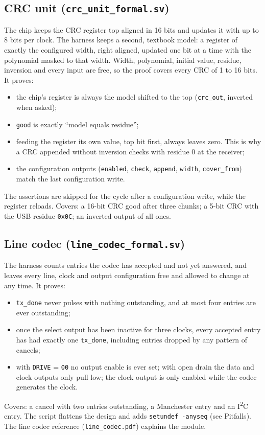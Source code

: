 \documentclass[11pt,a4paper]{article}
\newcommand{\file}[1]{\texttt{#1}}
\begin{document}
\subsection{CRC unit (\file{crc\_unit\_formal.sv})}
The chip keeps the CRC register top aligned in 16 bits and updates it with up to 8 bits per clock. The harness keeps a second, textbook model: a register of exactly the configured width, right aligned, updated one bit at a time with the polynomial masked to that width. Width, polynomial, initial value, residue, inversion and every input are free, so the proof covers every CRC of 1 to 16 bits. It proves:
\begin{itemize}
\item the chip's register is always the model shifted to the top (\texttt{crc\_out}, inverted when asked);
\item \texttt{good} is exactly ``model equals residue'';
\item feeding the register its own value, top bit first, always leaves zero. This is why a CRC appended without inversion checks with residue 0 at the receiver;
\item the configuration outputs (\texttt{enabled}, \texttt{check}, \texttt{append}, \texttt{width}, \texttt{cover\_from}) match the last configuration write.
\end{itemize}
The assertions are skipped for the cycle after a configuration write, while the register reloads. Covers: a 16-bit CRC good after three chunks; a 5-bit CRC with the USB residue \texttt{0x0C}; an inverted output of all ones.

\subsection{Line codec (\file{line\_codec\_formal.sv})}
The harness counts entries the codec has accepted and not yet answered, and leaves every line, clock and output configuration free and allowed to change at any time. It proves:
\begin{itemize}
\item \texttt{tx\_done} never pulses with nothing outstanding, and at most four entries are ever outstanding;
\item once the select output has been inactive for three clocks, every accepted entry has had exactly one \texttt{tx\_done}, including entries dropped by any pattern of cancels;
\item with \texttt{DRIVE} = \texttt{00} no output enable is ever set; with open drain the data and clock outputs only pull low; the clock output is only enabled while the codec generates the clock.
\end{itemize}
Covers: a cancel with two entries outstanding, a Manchester entry and an I\textsuperscript{2}C entry. The script flattens the design and adds \texttt{setundef -anyseq} (see Pitfalls). The line codec reference (\file{line\_codec.pdf}) explains the module.
\end{document}
